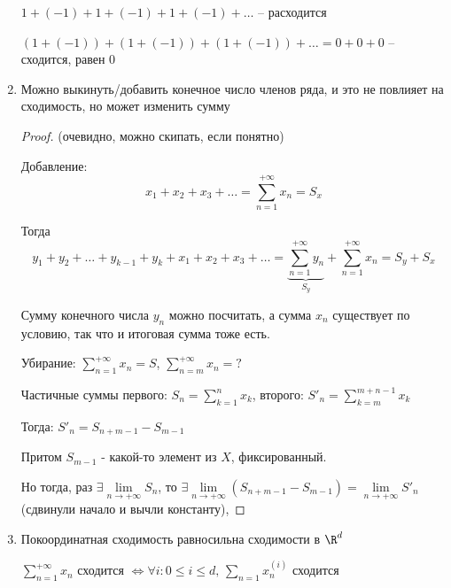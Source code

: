 \begin{properties}
\begin{enumerate}
\begin{remark}
                $1 + (-1) + 1 + (-1) + 1 + (-1) + \dots$ -- расходится

                $(1 + (-1)) + (1 + (-1)) + (1+(-1)) + \dots = 0 + 0 + 0$ -- сходится, равен 0
            \end{remark}
        \item Можно выкинуть/добавить конечное число членов ряда, и это не повлияет на сходимость, но может изменить сумму

            \begin{proof}
                (очевидно, можно скипать, если понятно)

                Добавление: 
                \[ x_1 + x_2 + x_3 + \dots = \sum\limits_{n=1}^{+\infty} x_n = S_x\]
                
                Тогда 
                \[
                y_1 + y_2 + \dots + y_{k-1} + y_k + x_1 + x_2 + x_3 + \dots = \underbrace{\sum\limits_{n = 1}^{+\infty} y_n}_{S_y} + \sum\limits_{n=1}^{+\infty} x_n = S_y + S_x\]

                Сумму конечного числа $y_n$ можно посчитать, а сумма $x_n$ существует по условию, так что и итоговая сумма тоже есть.



                Убирание: $\sum\limits_{n=1}^{+\infty} x_n = S$, $\sum\limits_{n=m}^{+\infty} x_n = ?$

                Частичные суммы первого: $S_n = \sum\limits_{k=1}^{n} x_k$, второго: $S'_n = \sum\limits_{k=m}^{m+n-1} x_k$

                Тогда: $S'_n = S_{n+m-1} - S_{m-1}$

                Притом $S_{m-1}$ - какой-то элемент из $X$, фиксированный.

                Но тогда, раз $\exists \lim\limits_{n \to +\infty} S_n$, то $\exists \lim\limits_{n \to +\infty} (S_{n+m-1} - S_{m-1}) = \lim\limits_{n \to +\infty} S'_n$ (сдвинули начало и вычли константу),
            \end{proof}
        \item Покоординатная сходимость равносильна сходимости в $\R^d$

            $\sum\limits_{n=1}^{+\infty} x_n$ сходится $\iff \forall i: 0 \le i \le d,\, \sum\limits_{n=1} x_n^{(i)}$ сходится


\end{enumerate}
\end{properties}
